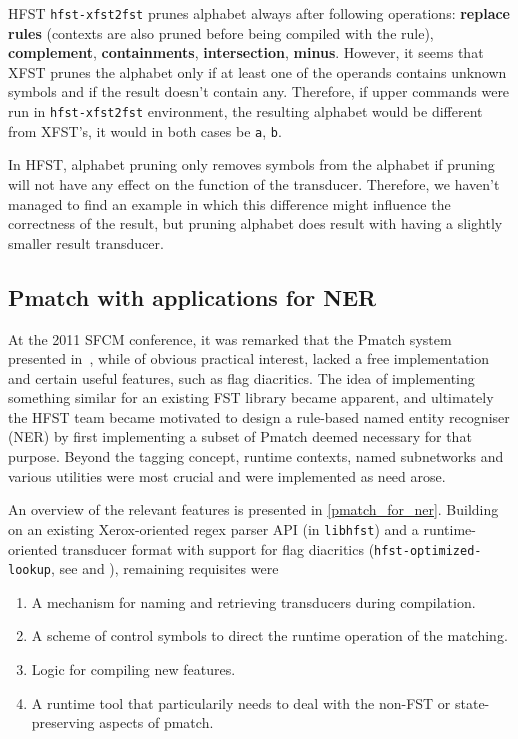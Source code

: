 \documentclass{llncs}
\begin{document}
HFST \verb+hfst-xfst2fst+ prunes alphabet always after following operations:
\textbf{replace rules} (contexts are also pruned before being compiled with the
rule), \textbf{complement}, \textbf{containments}, \textbf{intersection},
\textbf{minus}. However, it seems that XFST prunes the alphabet only if at
least one of the operands contains unknown symbols and if the result doesn't
contain any. Therefore, if upper commands were run in \verb+hfst-xfst2fst+
environment, the resulting alphabet would be different from XFST's, it
would in both cases be \verb+a+, \verb+b+.

In HFST, alphabet pruning only removes symbols from the alphabet if pruning will not have any effect on the function of the transducer.
Therefore, we haven't managed to find an example in which this difference might influence
the correctness of the result, but pruning alphabet does result with
having a slightly smaller result transducer.


\subsection{Pmatch with applications for NER}

At the 2011 SFCM conference, it was remarked that the Pmatch system presented
in~\cite{karttunen/2011}, while
of obvious practical interest, lacked a free implementation and certain
useful features, such as flag diacritics. The idea of implementing
something similar for an existing FST library became apparent, and
ultimately the HFST team became motivated to design a rule-based named entity
recogniser (NER) by first implementing a subset of Pmatch deemed
necessary for that purpose. Beyond the tagging concept,
runtime contexts, named subnetworks and various utilities were most crucial and
were implemented as need arose.

An overview of the relevant features is presented in \ref{pmatch_for_ner}.
Building on an existing Xerox-oriented regex parser API (in \verb+libhfst+) and a
runtime-oriented transducer format with support for flag diacritics
(\verb+hfst-optimized-lookup+, see \cite{silfverberg/2009} and
\cite{hfst/2011}), remaining requisites were

\begin{enumerate}
\item A mechanism for naming and retrieving transducers during compilation.
\item A scheme of control symbols to direct the runtime operation of the matching.
\item Logic for compiling new features.
\item A runtime tool that particularily needs to deal with the non-FST or
state-preserving aspects of pmatch.
\end{enumerate}
\end{document}
